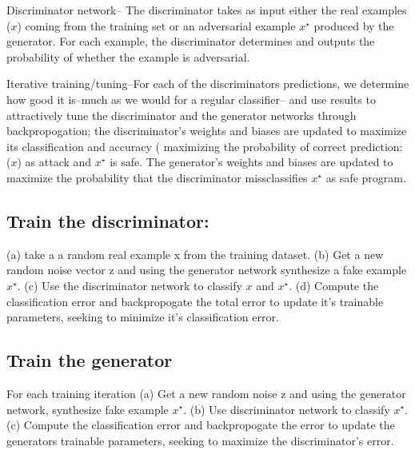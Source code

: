 Discriminator network-- The discriminator takes as input either the real examples ($x$) coming from the training set or an adversarial example $x^{\star}$ produced by the generator. For each example, the discriminator determines and outputs the probability of whether the example is adversarial.

Iterative training/tuning--For each of the discriminators predictions, we determine how good it is--much as we would for a regular classifier-- and use results to attractively tune the discriminator and the generator networks through backpropogation; the discriminator's weights and biases are updated to maximize its classification and accuracy ( maximizing the probability of correct prediction: ($x$) as attack and $x^{\star}$ is safe. 
The generator's weights and biases are updated to maximize the probability that the discriminator missclassifies $x^{\star}$ as safe program.  
 
 
 
 
 
 
 
 
 






\subsection{Train the discriminator:}
(a) take a a random real example x from the training dataset. (b) Get a new random noise vector z and using the generator network synthesize a fake example  $x^{\star}$. (c) Use the discriminator network to classify  $x$ and  $x^{\star}$. (d) Compute the classification error and backpropogate the total error to update it's trainable parameters, seeking to minimize it's classification error. 

\subsection{Train the generator}
For each training iteration
(a) Get a new random noise z and using the generator network, synthesize fake example $x^{\star}$. (b) Use discriminator network to classify $x^{\star}$. (c) Compute the classification error and backpropogate the error to update the generators trainable parameters, seeking to maximize the discriminator's error. 

